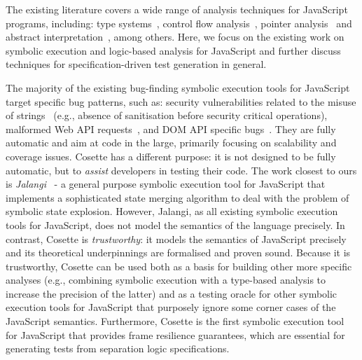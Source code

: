 \documentclass[sigconf, review]{acmart}
\newcommand{\cosette}{Cosette\xspace}
\newcommand{\myparagraph}[1]{\smallskip\noindent {\bf #1.}\hspace{1pt}}
\begin{document}
The existing literature covers a wide range of analysis techniques for JavaScript programs, including: 
type systems~\cite{thiemann:esop:2005,anderson:ecoop:2005,jensen:sas:2009,typescript:toot:2014,feldthaus:oopsla:2014,bierman:ecoop:2014,rastogi:popl:2015},
control flow analysis~\cite{feldthaus2013efficient}, pointer analysis~\cite{jang2009points,sridharan:ecoop:12} and abstract
interpretation~\cite{kashyap:fse:14,jensen:sas:2009,andreasen:oopsla:2014,park:ecoop:15}, among others. 
Here, we focus on the existing work on symbolic execution and  
logic-based analysis for JavaScript and further discuss techniques for specification-driven 
test generation in general.  

\myparagraph{Symbolic Execution for JS}
The majority of the existing bug-finding symbolic execution tools for JavaScript target specific bug patterns, 
such as: security vulnerabilities related to the misuse of strings~\cite{saxena:sp:2010} 
(e.g., absence of sanitisation before security critical operations), malformed Web API requests~\cite{wittern:icse:2018}, and
DOM API specific bugs~\cite{li:fse:2014}. They are fully automatic and aim at code in 
the large, primarily focusing on scalability and coverage issues. \cosette has a different 
purpose: it is not designed to be fully automatic, but to \emph{assist} developers in 
testing their code. 
%
The work closest to ours is \emph{Jalangi}~\cite{koushik:fse:2015} - a general purpose 
symbolic execution tool for JavaScript that implements a sophisticated state merging 
algorithm to deal with the problem of symbolic state explosion. 
%
However, Jalangi, as all existing symbolic execution tools for JavaScript, does not model 
the semantics of the language precisely. 
%
In contrast, \cosette is \emph{trustworthy}: it models the semantics of 
JavaScript precisely and its theoretical underpinnings are formalised and proven sound. 
Because it is trustworthy, \cosette can be used both as a basis for building other more specific analyses 
(e.g., combining symbolic execution with a type-based analysis to increase the precision of the latter) and 
as a testing oracle for other symbolic execution tools for JavaScript that purposely 
ignore some corner cases of the JavaScript semantics. 
Furthermore, \cosette is the first symbolic execution tool for JavaScript that provides 
frame resilience guarantees, which are essential for generating tests from separation logic specifications. 
\end{document}
